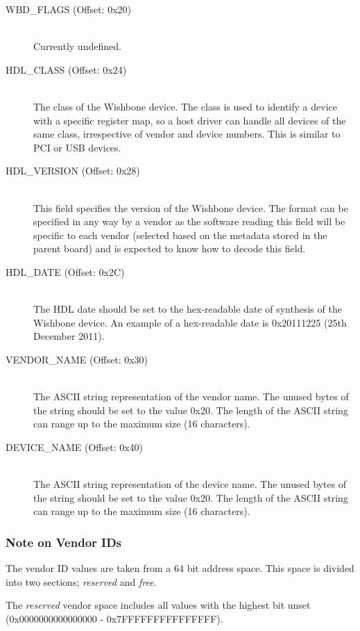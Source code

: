 \documentclass{article}
\begin{document}
\begin{description}
\item[WBD\_FLAGS (Offset: 0x20)] \hfill \\
Currently undefined.

\item[HDL\_CLASS (Offset: 0x24)] \hfill \\
The class of the Wishbone device. The class is used to identify a device
with a specific register map, so a host driver can handle all devices of
the same class, irrespective of vendor and device numbers. This is similar
to PCI or USB devices.

\item[HDL\_VERSION (Offset: 0x28)] \hfill \\
This field specifies the version of the Wishbone device. The format can be
specified in any way by a vendor as the software reading this field will be
specific to each vendor (selected based on the metadata stored in the
parent board) and is expected to know how to decode this field.

\item[HDL\_DATE (Offset: 0x2C)] \hfill \\
The HDL date should be set to the hex-readable date of synthesis of
the Wishbone device. An example of a hex-readable date is 0x20111225 (25th
December 2011).

\item[VENDOR\_NAME (Offset: 0x30)] \hfill \\
The ASCII string representation of the vendor name. The unused bytes of the
string should be set to the value 0x20. The length of the ASCII string can range
up to the maximum size (16 characters).

\item[DEVICE\_NAME (Offset: 0x40)] \hfill \\
The ASCII string representation of the device name. The unused bytes of the
string should be set to the value 0x20. The length of the ASCII string can range
up to the maximum size (16 characters).
\end{description}

\subsubsection{Note on Vendor IDs}
The vendor ID values are taken from a 64 bit address space.
This space is divided into two sections; \emph{reserved} and \emph{free}.

The \emph{reserved} vendor space includes all values with the highest 
bit unset (0x0000000000000000 - 0x7FFFFFFFFFFFFFFF).
\end{document}

